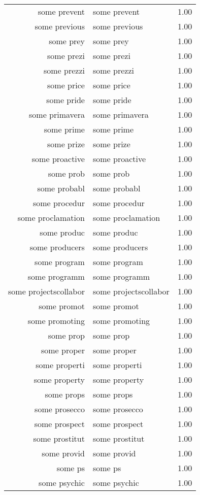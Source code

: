 \begin{table}[ht]
\begin{tabular}{rlr}
  some prevent & some prevent & 1.00 \\ 
  some previous & some previous & 1.00 \\ 
  some prey & some prey & 1.00 \\ 
  some prezi & some prezi & 1.00 \\ 
  some prezzi & some prezzi & 1.00 \\ 
  some price & some price & 1.00 \\ 
  some pride & some pride & 1.00 \\ 
  some primavera & some primavera & 1.00 \\ 
  some prime & some prime & 1.00 \\ 
  some prize & some prize & 1.00 \\ 
  some proactive & some proactive & 1.00 \\ 
  some prob & some prob & 1.00 \\ 
  some probabl & some probabl & 1.00 \\ 
  some procedur & some procedur & 1.00 \\ 
  some proclamation & some proclamation & 1.00 \\ 
  some produc & some produc & 1.00 \\ 
  some producers & some producers & 1.00 \\ 
  some program & some program & 1.00 \\ 
  some programm & some programm & 1.00 \\ 
  some projectscollabor & some projectscollabor & 1.00 \\ 
  some promot & some promot & 1.00 \\ 
  some promoting & some promoting & 1.00 \\ 
  some prop & some prop & 1.00 \\ 
  some proper & some proper & 1.00 \\ 
  some properti & some properti & 1.00 \\ 
  some property & some property & 1.00 \\ 
  some props & some props & 1.00 \\ 
  some prosecco & some prosecco & 1.00 \\ 
  some prospect & some prospect & 1.00 \\ 
  some prostitut & some prostitut & 1.00 \\ 
  some provid & some provid & 1.00 \\ 
  some ps & some ps & 1.00 \\ 
  some psychic & some psychic & 1.00 \\ 

\end{tabular}
\end{table}
